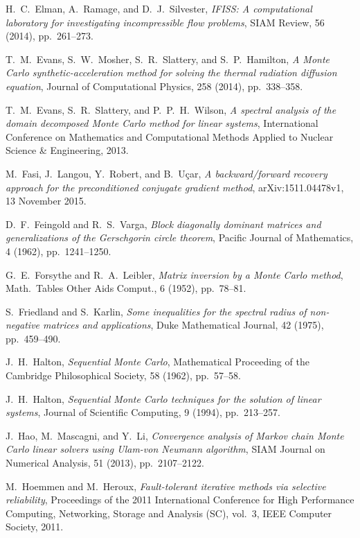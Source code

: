 \documentclass[final,leqno,onefignum,onetabnum]{siamltex1213}
\begin{document}
\begin{thebibliography}{9}
{\sc H.~C.~Elman, A.~Ramage, and D.~J.~Silvester}, 
{\em IFISS: A computational laboratory for investigating incompressible flow problems},
 SIAM Review, 56 (2014), pp.~261--273.
 
 {\sc T.~M.~Evans, S.~W.~Mosher, S.~R.~Slattery, and S.~P.~Hamilton},
 {\em A Monte Carlo synthetic-acceleration method for solving the thermal 
 radiation diffusion equation},
 Journal of Computational Physics, 
 258 (2014), pp.~338--358.
 
 {\sc T.~M.~Evans, S.~R.~Slattery, and P.~P.~H.~Wilson}, 
 {\em A spectral analysis of the domain decomposed Monte Carlo method for 
linear systems},
 International Conference on Mathematics and Computational Methods 
Applied to Nuclear Science \& Engineering, 2013.

 {\sc M.~Fasi, J.~Langou, Y.~Robert, and B.~U\c car},
 {\em A backward/forward recovery approach for the preconditioned
  conjugate gradient method}, arXiv:1511.04478v1, 13 November 2015.

{\sc D.~F.~Feingold and R.~S.~Varga},
  {\em Block diagonally dominant matrices and generalizations
   of the Gerschgorin circle theorem},
Pacific Journal of Mathematics, 4 (1962), pp.~1241--1250.
 
{\sc G.~E.~Forsythe and R.~A.~Leibler},
{\em Matrix inversion by a Monte Carlo method},
Math.~Tables Other Aids Comput., 6 (1952), pp.~78--81. 
  
  {\sc S.~Friedland and S.~Karlin},
  {\em Some inequalities for the spectral radius of non-negative matrices 
  and applications},
  Duke Mathematical Journal, 
  42 (1975), pp.~459--490.

 {\sc J.~H.~Halton},
 {\em Sequential Monte Carlo},
 Mathematical Proceeding of the Cambridge Philosophical Society,
 58 (1962), pp.~57--58.
 
 {\sc J.~H.~Halton}, 
 {\em Sequential Monte Carlo techniques for the solution of linear 
systems},
 Journal of Scientific Computing,
 9 (1994), pp.~213--257.
 
 {\sc J.~Hao, M.~Mascagni, and Y.~Li},
 {\em Convergence analysis of Markov chain Monte Carlo linear solvers using 
Ulam-von Neumann algorithm},
 SIAM Journal on Numerical Analysis,
 51 (2013), pp.~2107--2122.

  {\sc M.~Hoemmen and M.~Heroux},
  {\em Fault-tolerant iterative methods via selective reliability},
  Proceedings of the 2011 International Conference for High Performance
Computing, Networking, Storage and Analysis (SC), vol.~3, IEEE Computer Society,
2011.
  

\end{thebibliography}
\end{document}

